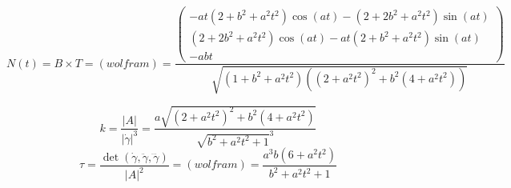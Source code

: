 \documentclass[10pt, a4paper]{article} %
\begin{document}
\[N(t) = B \times T = (wolfram) = \frac{\begin{pmatrix}
    -a t (2+b^2+a^2 t^2) \cos(a t)-(2+2 b^2+a^2 t^2) \sin(a t)\\
    (2+2 b^2+a^2 t^2) \cos(a t)-a t (2+b^2+a^2 t^2) \sin(a t)\\
    -a b t
\end{pmatrix}}{\sqrt{(1+b^2+a^2 t^2)((2+a^2 t^2)^2+b^2 (4+a^2 t^2))}}\]

\[k = \frac{|A|}{|\dot\gamma|^3} = \frac{a \sqrt{(2+a^2 t^2)^2+b^2 (4+a^2 t^2)}}{\sqrt{b^2 + a^2t^2 + 1}^3}\]
\[\tau = \frac{\det(\dot\gamma, \ddot\gamma, \dddot\gamma)}{|A|^2} = (wolfram) = \frac{a^3 b (6+a^2 t^2) }{b^2 + a^2t^2 + 1}\]
\end{document}
